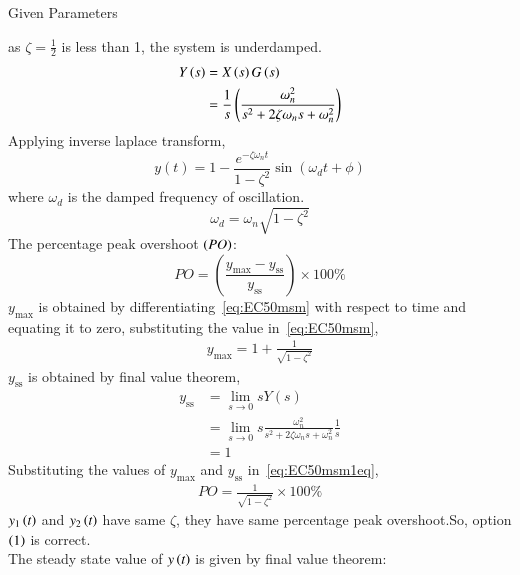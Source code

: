 \documentclass[journal,12pt,onecolumn]{IEEEtran}
\theoremstyle{remark}
\begin{document}
    \begin{table}[h!]
 	\centering
 	\resizebox{6 cm}{!}{
 		
 	}
 	\caption{Given Parameters}
 	\label{tab:msmECgate50tab2}
     \end{table} 
    as $\zeta = \frac{1}{2}$ is less than 1, the system is underdamped.
    \begin{align}
    Y\left(s\right) &= X\left(s\right) G\left(s\right)\\
    &= \frac{1}{s} \left(\frac{\omega_n^2}{s^2 + 2\zeta\omega_n s + \omega_n^2}\right)  
    \end{align}
    Applying inverse laplace transform,
    \begin{equation}
    y(t) = 1 - \frac{e^{-\zeta \omega_n t}}{1 - \zeta^2} \sin(\omega_d t + \phi)
    \label{eq:EC50msm}
    \end{equation}
    where $\omega_{d}$ is the damped frequency of oscillation.
    \begin{equation}
    \omega_{d} = \omega_{n}\sqrt{1 - {\zeta}^2}
    \label{eq:EC50msm2eq}
    \end{equation}
    The percentage peak overshoot $\left(PO\right)$:
    \begin{equation}
    PO = \left( \frac{y_{\text{max}} - y_{\text{ss}}}{y_{\text{ss}}} \right) \times 100\%
    \label{eq:EC50msm1eq}
    \end{equation}
    $y_{\text{max}}$ is obtained by differentiating~\eqref{eq:EC50msm} with respect to time and equating it to zero, substituting the value in~\eqref{eq:EC50msm},
    \begin{align}
    y_{\text{max}} = 1 + \frac{1}{\sqrt{1-{\zeta}^2}}
    \end{align}
    $y_{\text{ss}}$ is obtained by final value theorem,
    \begin{align}
    y_{\text{ss}} &= \lim_{{s \to 0}} sY(s)\\
    &= \lim_{{s \to 0}} s\frac{\omega_n^2}{s^2 + 2\zeta\omega_n s + \omega_n^2} \frac{1}{s}\\
    &= 1
    \end{align} 
    Substituting the values of $y_{\text{max}}$ and $y_{\text{ss}}$ in~\eqref{eq:EC50msm1eq}, 
    \begin{align}
    PO = \frac{1}{\sqrt{1-{\zeta}^2}} \times 100\%
    \end{align}
    $y_{1}\left(t\right)$ and $y_{2}\left(t\right)$ have same $\zeta$, they have same percentage peak overshoot.So, option $\left(1\right)$ is correct.\\
    The steady state value of $y\left(t\right)$ is given by final value theorem:
\end{document}
